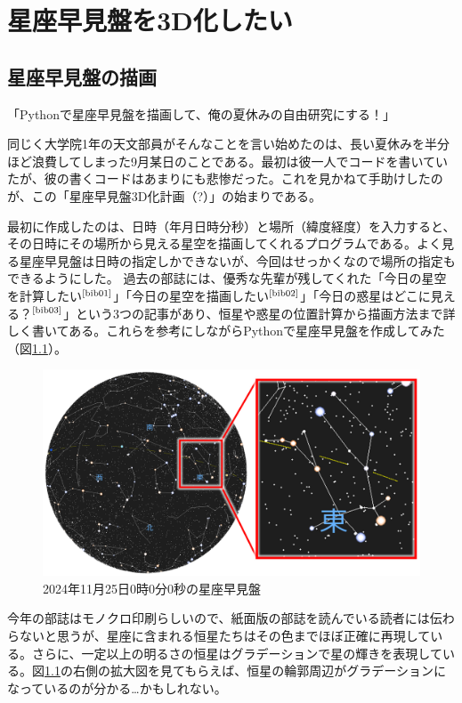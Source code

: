 \documentclass[../main]{subfiles}
\begin{document}
\chapter{星座早見盤を3D化したい} %


\section{星座早見盤の描画}
「Pythonで星座早見盤を描画して、俺の夏休みの自由研究にする！」

同じく大学院1年の天文部員がそんなことを言い始めたのは、長い夏休みを半分ほど浪費してしまった9月某日のことである。最初は彼一人でコードを書いていたが、彼の書くコードはあまりにも悲惨だった。これを見かねて手助けしたのが、この「星座早見盤3D化計画（?）」の始まりである。

最初に作成したのは、日時（年月日時分秒）と場所（緯度経度）を入力すると、その日時にその場所から見える星空を描画してくれるプログラムである。よく見る星座早見盤は日時の指定しかできないが、今回はせっかくなので場所の指定もできるようにした。
過去の部誌には、優秀な先輩が残してくれた「今日の星空を計算したい$^\text{\cite{bib01}}$」「今日の星空を描画したい$^\text{\cite{bib02}}$」「今日の惑星はどこに見える？$^\text{\cite{bib03}}$」という3つの記事があり、恒星や惑星の位置計算から描画方法まで詳しく書いてある。これらを参考にしながらPythonで星座早見盤を作成してみた（図\ref{fig01}）。
\begin{figure}[H]
  \centering
  \includegraphics[width=15cm]{sections/Fujisawa/image/planisphere_normal.png}
  \caption{2024年11月25日0時0分0秒の星座早見盤}
  \label{fig01}
\end{figure}
今年の部誌はモノクロ印刷らしいので、紙面版の部誌を読んでいる読者には伝わらないと思うが、星座に含まれる恒星たちはその色までほぼ正確に再現している。さらに、一定以上の明るさの恒星はグラデーションで星の輝きを表現している。図\ref{fig01}の右側の拡大図を見てもらえば、恒星の輪郭周辺がグラデーションになっているのが分かる…かもしれない。
\end{document}
